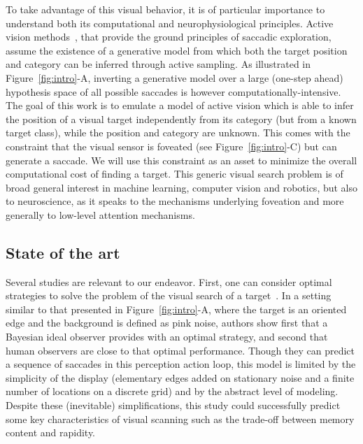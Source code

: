
To take advantage of this visual behavior, it is of particular importance to understand both its computational and neurophysiological principles.
Active vision methods~\citep{Najemnik05,Butko2010infomax,Friston12}, that provide the ground principles of saccadic exploration, assume the existence of a generative model from which both the target position and category can be inferred through active sampling. As illustrated in Figure~\ref{fig:intro}-A, inverting a generative model over a large (one-step ahead) hypothesis space of all possible saccades is however computationally-intensive. %
The goal of this work is to emulate a model of active vision which is able to infer the position of a visual target independently from its category (but from a known target class), while the position and category are unknown. This comes with the constraint that the visual sensor is foveated (see Figure~\ref{fig:intro}-C) but can generate a saccade. We will use this constraint as an asset to minimize the overall computational cost of finding a target. This generic visual search problem is of broad general interest in machine learning, computer vision and robotics, but also to neuroscience, as it speaks to the mechanisms underlying foveation and more generally to low-level attention mechanisms.
\CNS

\subsection{State of the art}
Several studies are relevant to our endeavor. First, one can consider optimal strategies to solve the problem of the visual search of a target~\citep{Najemnik05}. In a setting similar to that presented in Figure~\ref{fig:intro}-A, where the target is an oriented edge and the background is defined as pink noise, authors show first that a Bayesian ideal observer provides with an optimal strategy, and second that human observers are close to that optimal performance. Though they can predict a sequence of saccades in this perception action loop, this model is limited by the simplicity of the display (elementary edges added on stationary noise and a finite number of locations on a discrete grid) and by the abstract level of modeling. Despite these (inevitable) simplifications, this study could successfully predict some key characteristics of visual scanning such as the trade-off between memory content and rapidity.

